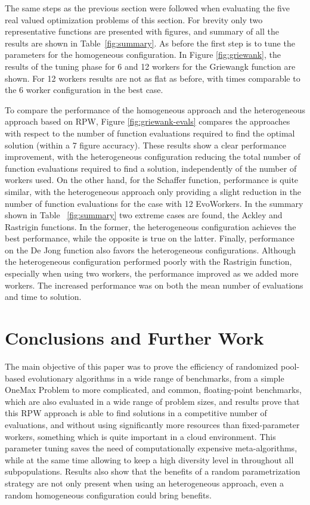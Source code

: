 \documentclass[conference]{IEEEtran}
\begin{document}
The same steps as the previous section were followed when evaluating the five real valued
optimization problems of this section.  For brevity only two representative functions are
presented with figures, and summary of all the results are shown in Table~\ref{fig:summary}. As before
the first step is to tune the parameters for the homogeneous configuration.
In Figure \ref{fig:griewank}, the results of the tuning phase for 6 and 12 workers
for the Griewangk function are shown. For 12 workers results are not as flat as before,
with times comparable to the 6 worker configuration in the best case.

To compare the performance of the homogeneous approach and the heterogeneous approach based on RPW,
Figure \ref{fig:griewank-evals} compares the approaches with respect to the number of function evaluations required to find the optimal solution (within a 7 figure accuracy).
These results show a clear performance improvement, with the heterogeneous configuration
reducing the total number of function evaluations required to find a solution,
independently of the number of workers used.
On the other hand, for the Schaffer function, performance is quite similar,
with the heterogeneous approach only providing a slight reduction in the number
of function evaluations for the case with 12 EvoWorkers.
In the summary shown in Table ~\ref{fig:summary} two extreme cases are found, the Ackley and Rastrigin functions.
In the former, the heterogeneous configuration achieves the best performance, while the opposite is true on the latter.
Finally, performance on the De Jong function also favors the heterogeneous configurations.
Although the heterogeneous configuration performed poorly with the Rastrigin
function, especially when using two workers, the performance improved as we
added more workers.  The increased performance was on both the mean number of
evaluations and time to solution.
\section{Conclusions and Further Work}
\label{sec:conclusions}

The main objective of this paper was to prove the efficiency of
randomized pool-based evolutionary algorithms in a wide range of
benchmarks, from a simple OneMax Problem to more complicated, and
common, floating-point benchmarks, which are also evaluated in a wide
range of problem sizes, and results prove that this RPW approach is
able to find solutions in a competitive number of evaluations, and
without using significantly more resources than fixed-parameter
workers, something which is quite important in a cloud
environment. This parameter tuning saves the need of computationally
expensive meta-algorithms, while at the same time allowing to keep a
high diversity level in throughout all subpopulations.
Results also show that the benefits of a random parametrization
strategy are not only present when using an heterogeneous approach, 
even a random homogeneous configuration could bring benefits.
\end{document}
